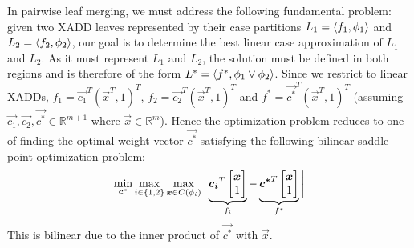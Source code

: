 \label{sec:leaf_approx}

%
%

In pairwise leaf merging, we must address the following fundamental
problem: given two XADD leaves represented by their case partitions
$L_1 = \langle f_1, \phi_1 \rangle$ and $L_2 = \langle f_2, \phi_2 \rangle$, our goal is to
determine the best linear case approximation of $L_1$ and $L_2$.  As
it must represent $L_1$ and $L_2$, the solution must be defined in
both regions and is therefore of the form $L^* =
\langle f^*,\phi_1 \lor \phi_2 \rangle$.  Since we restrict to linear XADDs, 
$f_1 = \vec{c_1}^T (\vec{x}^T,1)^T$, $f_2 = \vec{c_2}^T (\vec{x}^T,1)^T$ and 
$f^* = \vec{c^*}^T (\vec{x}^T,1)^T$ (assuming
$\vec{c_1},\vec{c_2},\vec{c^*} \in \mathbb{R}^{m+1}$ where $\vec{x} \in \mathbb{R}^{m}$).  
Hence the optimization problem reduces
to one of finding the optimal weight vector $\vec{c^*}$ satisfying the
following bilinear saddle point optimization problem:
\begin{equation} 
\min_{\boldsymbol{c}^*} \max_{i \in \{ 1, 2 \}} \max_{\boldsymbol{x} \in C(\phi_i)} \bigg| \underbrace{\boldsymbol{c_i}^T \begin{bmatrix} \boldsymbol{x}\\1 \end{bmatrix}}_{f_i} - \underbrace{\boldsymbol{c^*}^T \begin{bmatrix} \boldsymbol{x}\\1 \end{bmatrix}}_{f^*} \bigg| \label{eq:optimglo} 
\end{equation}
This is bilinear due to the inner product of $\vec{c^*}$ with $\vec{x}$.
%


